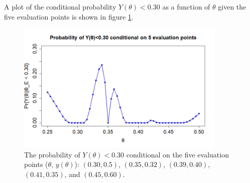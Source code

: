 A plot of the conditional probability $Y(\theta)<0.30$ as a function of $\theta$ given the five evaluation points is shown in figure \ref{2b}. 


\begin{figure}
    \centering
    \includegraphics[width=100mm]{2bPlot.png}
    \caption{The probability of $Y(\theta)<0.30$ conditional on the five evaluation points ($\theta$, $y(\theta)$): $(0.30,0.5)$, $(0.35,0.32)$, $(0.39,0.40)$, $(0.41,0.35)$, and $(0.45,0.60)$. }
    \label{2b}
\end{figure}